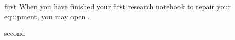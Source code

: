 \documentclass[notebook]{guildcamp4} %
\begin{document}
\startnotebook{\nJamesVerBlood{}}

\begin{page}{first}
When you have finished your first research notebook to repair your equipment, you may open .
\end{page}

\begin{page}{second}
\end{page}

\endnotebook
\end{document}
